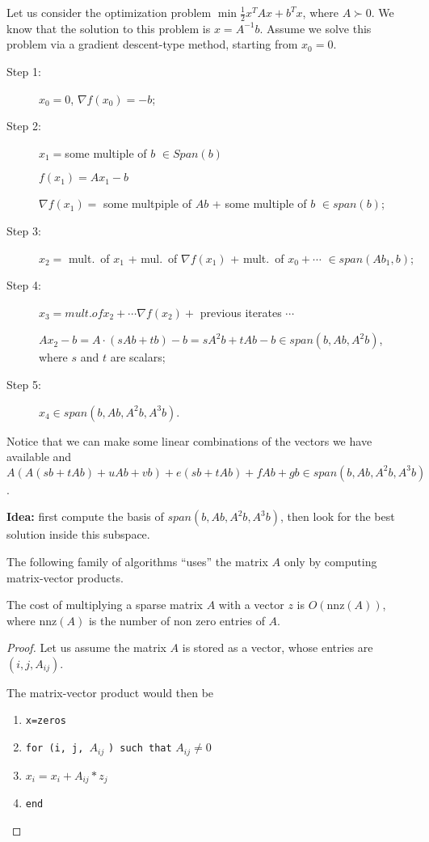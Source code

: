 \documentclass[ComputationalMathematics.tex]{subfiles}
\begin{document}
\begin{example}
  Let us consider the optimization problem $\min \frac{1}{2}x^T A x + b^T x $, where $A \succ 0$. We know that the solution to this problem is $x=A^{-1}b$. Assume we solve this problem via a gradient descent-type method, starting from $x_0=0$.
  \begin{description}
    \item[{\sc Step 1:}] $x_0 = 0$, $\nabla f(x_0) = -b$;
    \item[{\sc Step 2:}] $x_1 = $some multiple of $b$ $\in Span(b)$
      
      $f(x_1) = Ax_1 - b$

      $\nabla f(x_1) = $ some multpiple of $Ab$ + some multiple of $b$ $\in span(b)$;
    \item[{\sc Step 3:}] $x_2 = $ mult.~of $x_1$ + mul.~of $\nabla f(x_1)$ + mult.~of $x_0 + \cdots $ $\in span(Ab_1, b)$;
    \item[{\sc Step 4:}] $x_3 = mult. of x_2 + \cdots \nabla f(x_2) + $ previous iterates $\cdots$

      $Ax_2 - b = A \cdot (sAb + tb) - b= s A^2 b + tAb -b \in span(b, Ab, A^2b)$, where $s$ and $t$ are scalars;
    \item[{\sc Step 5:}] $x_4 \in span(b, Ab, A^2b, A^3b)$.
  \end{description}
  Notice that we can make some linear combinations of the vectors we have available and $A(A(sb + tAb) +uAb + vb) + e(sb + tAb) + fAb+gb \in span(b, Ab, A^2b, A^3b)$.
\end{example}

  \textbf{Idea:} first compute the basis of $span(b, Ab, A^2b, A^3b)$, then look for the best solution inside this subspace.

The following family of algorithms ``uses'' the matrix $A$ only by computing matrix-vector products.

\begin{obs}
  The cost of multiplying a sparse matrix $A$ with a vector $z$ is $O(\text{nnz}(A))$, where $\text{nnz}(A)$ is the number of non zero entries of $A$.
\end{obs}

\begin{proof}
  Let us assume the matrix $A$ is stored as a vector, whose entries are $(i, j, A_{ij})$.

  The matrix-vector product would then be
  \begin{enumerate}
    \item \texttt{x=zeros}
    \item \texttt{for (i, j, }$A_{ij}$ \texttt{) such that} $A_{ij} \neq 0$
    \item $x_i = x_i + A_{ij} * z_j$
    \item \texttt{end}
  \end{enumerate}
\end{proof}
\end{document}
